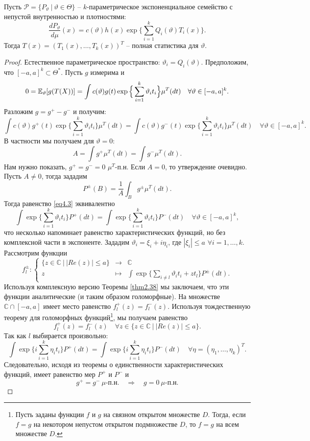 \begin{thm} \label{thm4.25}
	Пусть $\mathcal{P} = \{ P_\vartheta\ |\ \vartheta \in \Theta \}$ -- $k$-параметрическое экспоненциальное семейство с непустой внутренностью и плотностями:
	\[ \frac{dP_\vartheta}{d\mu}(x) = c(\vartheta) h(x) \exp\Big \{ \sum_{i=1}^{k}Q_i(\vartheta)T_i(x)  \Big\}. \]
	Тогда $T(x) = (T_1(x), \dots, T_k(x))^T$ -- полная статистика для $\vartheta$.
\end{thm}
\begin{proof}
	Естественное параметрическое пространство: $\vartheta_i = Q_i(\vartheta)$. Предположим, что $[-a, a]^k \subset \Theta^*$. Пусть $g$ измерима и
	\[ 0 = \mathbb{E}_\vartheta[g(T(X))] = \int c(\vartheta) g(t) \exp \Big\{ \sum_{i=1}^{k} \vartheta_i t_i  \Big \} \mu^T(dt) \quad \forall \vartheta \in [-a, a]^k. \]
	Разложим $g = g^+ - g^-$ и получим:
	\begin{equation} \label{eq4.3}
		\int c(\vartheta) g^+(t) \exp \Big\{ \sum_{i=1}^{k} \vartheta_i t_i  \Big \} \mu^T(dt)  = \int c(\vartheta) g^-(t) \exp \Big\{ \sum_{i=1}^{k} \vartheta_i t_i  \Big \} \mu^T(dt) \quad \forall \vartheta \in [-a, a]^k.
	\end{equation}
	В частности мы получаем для $\vartheta = 0$:
	\[ A = \int g^+ \mu^T(dt) = \int g^- \mu^T(dt). \]
	Нам нужно показать, $g^+ = g^- = 0$ $\mu^T$-п.н. Если $A = 0$, то утверждение очевидно. Пусть $ A \neq 0$, тогда зададим
	\[ P^\pm(B) = \frac{1}{A} \int_B g^\pm \mu^T(dt). \]
	Тогда равенство \eqref{eq4.3} эквивалентно
	\[ \int \exp \Big\{ \sum_{i=1}^{k} \vartheta_i t_i  \Big \} P^+(dt) = \int \exp \Big\{ \sum_{i=1}^{k} \vartheta_i t_i  \Big \} P^-(dt) \quad \forall \vartheta \in [-a, a]^k, \]
	что несколько напоминает равенство характеристических функций, но без комплексной части в экспоненте. Зададим $\vartheta_i = \xi_i + i \eta_i$, где $|\xi_i| \leq a$ $\forall i = 1, \dots, k $. Рассмотрим функции
	\[f_l^\pm \colon
	\left \{
	\begin{array}{ccl}
	\{ z \in \mathbb{C}\ |\ |Re(z)| \leq a \} & \rightarrow & \mathbb{C} \\
	z & \mapsto & \int \exp \Big\{ \sum\limits_{i \neq l} \vartheta_i t_i + z t_l \Big\} P^\pm(dt).
	\end{array}
	\right.
	\]
	Используя комплексную версию Теоремы \ref{thm2.38} мы заключаем, что эти функции аналитические (и таким образом голоморфные). На множестве $\mathbb{C} \cap [-a, a]$ имеет место равенство $f_l^+(z) = f_l^-(z)$. Используя тождественную теорему для голоморфных функций\footnote{
		Пусть заданы функции $f$ и $g$ на связном открытом множестве $D$. Тогда, если $f = g$ на некотором непустом открытом подмножестве $D$, то $f = g$ на всем множестве $D$.},
	мы получаем равенство
	\[ f_l^+(z) = f_l^-(z) \quad \forall z \in \{z \in \mathbb{C}\ |\ |Re(z)| \leq a  \}. \]
	Так как $l$ выбирается произвольно:
	\[ \int \exp \Big\{ i \sum_{i=1}^{k} \eta_i t_i \Big \} P^+(dt) = \int \exp \Big\{ i \sum_{i=1}^{k} \eta_i t_i \Big \} P^-(dt) \quad \forall \eta = (\eta_1, \dots, \eta_k)^T.  \]
	Следовательно, исходя из теоремы о единственности характеристических функций, имеет равенство мер $P^+$ и $P^-$ и
	\[ g^+ = g^- \ \mu\text{-п.н.} \quad \Longrightarrow \quad g = 0 \ \mu\text{-п.н.} \]
\end{proof}

